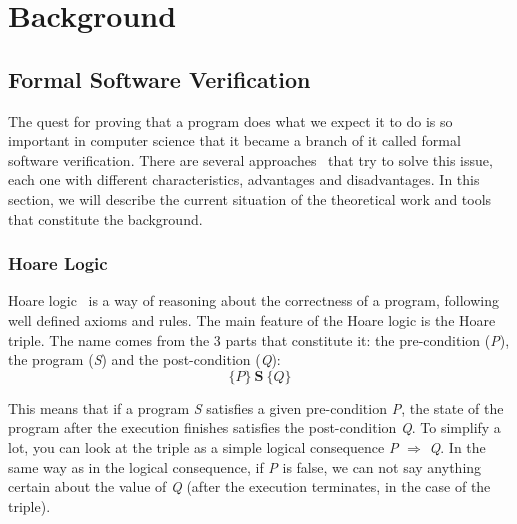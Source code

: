 
%

\chapter{Background}
\label{cha:background}

\glsresetall


\section{Formal Software Verification}
\label{sec:formal_software_verification}

The quest for proving that a program does what we expect it to do is so important in computer science that it became a branch of it called formal software verification. 
There are several approaches~\cite{DBLP:conf/fm/BrainP24} that try to solve this issue, each one with different characteristics, advantages and disadvantages. 
In this section, we will describe the current situation of the theoretical work and tools that constitute the background.


\subsection{Hoare Logic} 
\label{sub:hoare_logic}

Hoare logic~\cite{hoare69} is a way of reasoning about the correctness of a program, following well defined axioms and rules.
The main feature of the Hoare logic is the Hoare triple. 
The name comes from the 3 parts that constitute it: the pre-condition (\emph{P}), the program (\emph{S}) and the post-condition (\emph{Q}):
\[ \{P\} \ \textbf{S} \ \{Q\} \]

This means that if a program \emph{S} satisfies a given pre-condition \emph{P}, the state of the program after the execution finishes satisfies the post-condition \emph{Q}.
To simplify a lot, you can look at the triple as a simple logical consequence \emph{P} $\Rightarrow$ \emph{Q}.
In the same way as in the logical consequence, if \emph{P} is false, we can not say anything certain about the value of \emph{Q} (after the execution terminates, in the case of the triple).

